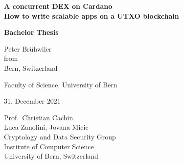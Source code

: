 \documentclass[a4paper,twoside,12pt]{report}
\newcommand{\thesistitle}{A concurrent DEX on Cardano}
\newcommand{\thesisauthor}{Peter Brühwiler}
\newcommand{\thesisauthororigin}{Bern, Switzerland}
\newcommand{\thesisleiter}{Prof.\ Christian Cachin}
\newcommand{\thesisasst}{Luca Zanolini, Jovana Micic}
\newcommand{\thesissubtitle}{How to write scalable apps on a UTXO blockchain}
\newcommand{\thesisdate}{31. December 2021}
\begin{document}

\begin{titlepage}  
  \thispagestyle{empty}

  \begin{center}  
    \begin{figure}[t]  
      \vspace{1in}     
    \end{figure}
    
    {\bfseries\Huge \thesistitle \\[2mm]
      \Large \thesissubtitle}\\
    \vspace{1.5cm}

    {\bfseries\LARGE Bachelor Thesis}\\
    \vspace{1.5cm}
    
    {\Large \thesisauthor\\[2mm]
      from\\[2mm]
      \thesisauthororigin}\\
    \vspace{1.5cm}

    {\Large Faculty of Science, University of Bern}\\
    \vspace{1.5cm}

    {\Large \thesisdate}\\
    \vspace{1.5cm}

    \vspace*{\fill}
    {\Large
      \thesisleiter\\
      \thesisasst\\
      Cryptology and Data Security Group\\
      Institute of Computer Science\\
      University of Bern, Switzerland\\}
  \end{center}
\end{titlepage}
\end{document}
